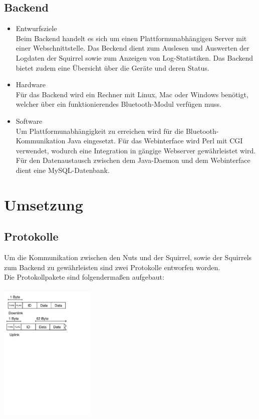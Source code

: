 \documentclass[12pt,a4paper]{article}
\begin{document}
\subsection{Backend}
\begin{itemize}
	\item Entwurfsziele\\
	Beim Backend handelt es sich um einen Plattformunabhängigen Server mit einer Webschnittstelle. Das Beckend dient zum Auslesen und Auswerten der Logdaten der Squirrel sowie zum Anzeigen von Log-Statistiken. Das Backend bietet zudem eine Übersicht über die Geräte und deren Status.
	\item Hardware\\
	Für das Backend wird ein Rechner mit Linux, Mac oder Windows benötigt, welcher über ein funktionierendes Bluetooth-Modul verfügen muss.
	\item Software\\
	Um Plattformunabhängigkeit zu erreichen wird für die Bluetooth-Kommunikation Java eingesetzt. Für das Webinterface wird Perl mit CGI verwendet, wodurch eine Integration in gängige Webserver gewährleistet wird. Für den Datenaustausch zwischen dem Java-Daemon und dem Webinterface dient eine MySQL-Datenbank.
\end{itemize}
\section{Umsetzung}
\subsection{Protokolle}
Um die Kommunikation zwischen den Nuts und der Squirrel, sowie der Squirrels zum Backend zu gewährleisten sind zwei Protokolle entworfen worden.\\
Die Protokollpakete sind folgendermaßen aufgebaut:
\\
\\
\includegraphics[height=6.5cm]{./ProkollDiagrams.pdf}\\
\end{document}
